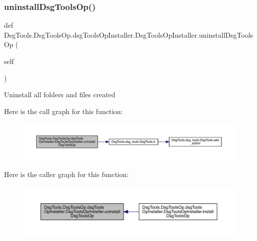 \subsubsection{\texorpdfstring{uninstall\+Dsg\+Tools\+Op()}{uninstallDsgToolsOp()}}
{\footnotesize\ttfamily def Dsg\+Tools.\+Dsg\+Tools\+Op.\+dsg\+Tools\+Op\+Installer.\+Dsg\+Tools\+Op\+Installer.\+uninstall\+Dsg\+Tools\+Op (\begin{DoxyParamCaption}\item[{}]{self }\end{DoxyParamCaption})}

\begin{DoxyVerb}Uninstall all folders and files created
\end{DoxyVerb}
 Here is the call graph for this function\+:
\nopagebreak
\begin{figure}[H]
\begin{center}
\leavevmode
\includegraphics[width=350pt]{class_dsg_tools_1_1_dsg_tools_op_1_1dsg_tools_op_installer_1_1_dsg_tools_op_installer_a4182f7f63775d033eecb6f428fefaf38_cgraph}
\end{center}
\end{figure}
Here is the caller graph for this function\+:
\nopagebreak
\begin{figure}[H]
\begin{center}
\leavevmode
\includegraphics[width=350pt]{class_dsg_tools_1_1_dsg_tools_op_1_1dsg_tools_op_installer_1_1_dsg_tools_op_installer_a4182f7f63775d033eecb6f428fefaf38_icgraph}
\end{center}
\end{figure}
\mbox{\label{class_dsg_tools_1_1_dsg_tools_op_1_1dsg_tools_op_installer_1_1_dsg_tools_op_installer_a8650989789a77d928a1fee122e82d45c}} 
